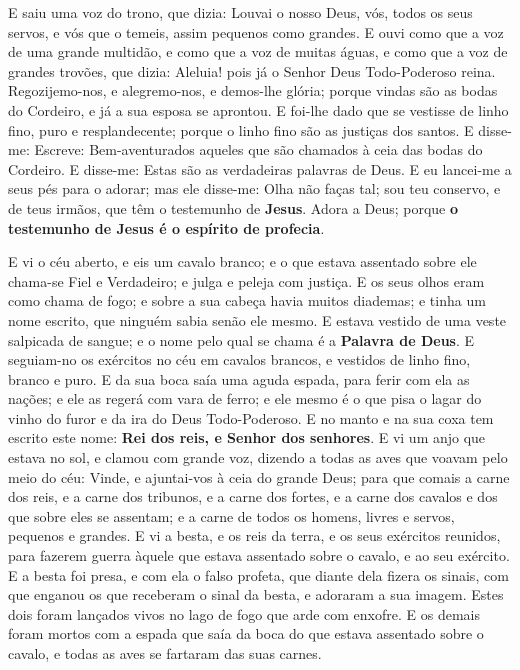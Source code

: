 E saiu uma voz do trono, que dizia: Louvai o nosso Deus, vós,
todos os seus servos, e vós que o temeis, assim pequenos como
grandes. E ouvi como que a voz de uma grande multidão, e como
que a voz de muitas águas, e como que a voz de grandes trovões, que
dizia: Aleluia! pois já o Senhor Deus Todo-Poderoso reina.
Regozijemo-nos, e alegremo-nos, e demos-lhe glória; porque
vindas são as bodas do Cordeiro, e já a sua esposa se aprontou.
E foi-lhe dado que se vestisse de linho fino, puro e
resplandecente; porque o linho fino são as justiças dos santos.
E disse-me: Escreve: Bem-aventurados aqueles que são chamados à
ceia das bodas do Cordeiro. E disse-me: Estas são as verdadeiras
palavras de Deus. E eu lancei-me a seus pés para o adorar;
mas ele disse-me: Olha não faças tal; sou teu conservo, e de teus
irmãos, que têm o testemunho de \textbf{Jesus}. Adora a Deus; porque
\textbf{o testemunho de Jesus é o espírito de profecia}.

E vi o céu aberto, e eis um cavalo branco; e o que estava
assentado sobre ele chama-se Fiel e Verdadeiro; e julga e peleja com
justiça. E os seus olhos eram como chama de fogo; e sobre a
sua cabeça havia muitos diademas; e tinha um nome escrito, que
ninguém sabia senão ele mesmo. E estava vestido de uma veste
salpicada de sangue; e o nome pelo qual se chama é a \textbf{Palavra
de Deus}. E seguiam-no os exércitos no céu em cavalos
brancos, e vestidos de linho fino, branco e puro. E da sua
boca saía uma aguda espada, para ferir com ela as nações; e ele as
regerá com vara de ferro; e ele mesmo é o que pisa o lagar do vinho
do furor e da ira do Deus Todo-Poderoso. E no manto e na sua
coxa tem escrito este nome: \textbf{Rei dos reis, e Senhor dos
senhores}. E vi um anjo que estava no sol, e clamou com
grande voz, dizendo a todas as aves que voavam pelo meio do céu:
Vinde, e ajuntai-vos à ceia do grande Deus; para que comais a
carne dos reis, e a carne dos tribunos, e a carne dos fortes, e a
carne dos cavalos e dos que sobre eles se assentam; e a carne de
todos os homens, livres e servos, pequenos e grandes. E vi a
besta, e os reis da terra, e os seus exércitos reunidos, para
fazerem guerra àquele que estava assentado sobre o cavalo, e ao seu
exército. E a besta foi presa, e com ela o falso profeta, que
diante dela fizera os sinais, com que enganou os que receberam o
sinal da besta, e adoraram a sua imagem. Estes dois foram lançados
vivos no lago de fogo que arde com enxofre. E os demais foram
mortos com a espada que saía da boca do que estava assentado sobre o
cavalo, e todas as aves se fartaram das suas carnes.

